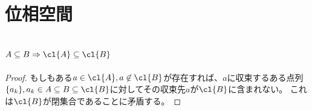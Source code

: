 \chapter{位相空間}
    \section{\texorpdfstring{$A \subseteq B \Rightarrow \cl{A} \subseteq \cl{B}$}{A⊆B ⇒ cl(A)⊆cl(B)}}
        \begin{proof}
            \quad\par
            もしもある$a\in \cl{A}, a\not\in\cl{B}$が存在すれば、$a$に収束するある点列$\{a_k\}, a_k\in A \subseteq B \subseteq \cl{B}$に対してその収束先$a$が$\cl{B}$に含まれない。
            これは$\cl{B}$が閉集合であることに矛盾する。
        \end{proof}